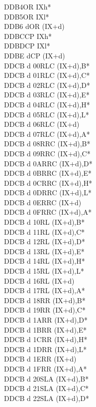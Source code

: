\documentclass[oneside,a4paper]{book}
\begin{document}
\begin{multicols}{3}
{\begin{tabbing}
DDB4\>OR IXh*\\
DDB5\>OR IXl*\\
DDB6 d\>OR (IX+d)\\
DDBC\>CP IXh*\\
DDBD\>CP IXl*\\
DDBE d\>CP (IX+d)\\
DDCB d 00\>RLC (IX+d),B*\\
DDCB d 01\>RLC (IX+d),C*\\
DDCB d 02\>RLC (IX+d),D*\\
DDCB d 03\>RLC (IX+d),E*\\
DDCB d 04\>RLC (IX+d),H*\\
DDCB d 05\>RLC (IX+d),L*\\
DDCB d 06\>RLC (IX+d)\\
DDCB d 07\>RLC (IX+d),A*\\
DDCB d 08\>RRC (IX+d),B*\\
DDCB d 09\>RRC (IX+d),C*\\
DDCB d 0A\>RRC (IX+d),D*\\
DDCB d 0B\>RRC (IX+d),E*\\
DDCB d 0C\>RRC (IX+d),H*\\
DDCB d 0D\>RRC (IX+d),L*\\
DDCB d 0E\>RRC (IX+d)\\
DDCB d 0F\>RRC (IX+d),A*\\
DDCB d 10\>RL (IX+d),B*\\
DDCB d 11\>RL (IX+d),C*\\
DDCB d 12\>RL (IX+d),D*\\
DDCB d 13\>RL (IX+d),E*\\
DDCB d 14\>RL (IX+d),H*\\
DDCB d 15\>RL (IX+d),L*\\
DDCB d 16\>RL (IX+d)\\
DDCB d 17\>RL (IX+d),A*\\
DDCB d 18\>RR (IX+d),B*\\
DDCB d 19\>RR (IX+d),C*\\
DDCB d 1A\>RR (IX+d),D*\\
DDCB d 1B\>RR (IX+d),E*\\
DDCB d 1C\>RR (IX+d),H*\\
DDCB d 1D\>RR (IX+d),L*\\
DDCB d 1E\>RR (IX+d)\\
DDCB d 1F\>RR (IX+d),A*\\
DDCB d 20\>SLA (IX+d),B*\\
DDCB d 21\>SLA (IX+d),C*\\
DDCB d 22\>SLA (IX+d),D*\\

\end{tabbing}}
\end{multicols}
\end{document}
